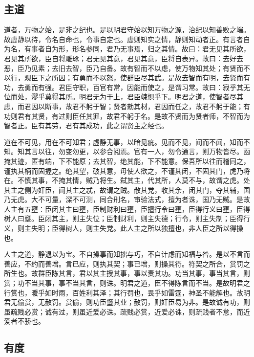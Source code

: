 \documentclass[]{article}
\begin{document}
\hypertarget{header-n836}{%
\subsection{主道}\label{header-n836}}

道者，万物之始，是非之纪也。是以明君守始以知万物之源，治纪以知善败之端。故虚静以待，令名自命也，令事自定也。虚则知实之情，静则知动者正。有言者自为名，有事者自为形，形名参同，君乃无事焉，归之其情。故曰：君无见其所欲，君见其所欲，臣自将雕琢；君无见其意，君见其意，臣将自表异。故曰：去好去恶，臣乃见素；去旧去智，臣乃自备。故有智而不以虑，使万物知其处；有贤而不以行，观臣下之所因；有勇而不以怒，使群臣尽其武。是故去智而有明，去贤而有功，去勇而有强。君臣守职，百官有常，因能而使之，是谓习常。故曰：寂乎其无位而处，漻乎莫得其所。明君无为于上，君臣竦惧乎下。明君之道，使智者尽其虑，而君因以断事，故君不躬于智；贤者勑其材，君因而任之，故君不躬于能；有功则君有其贤，有过则臣任其罪，故君不躬于名。是故不贤而为贤者师，不智而为智者正。臣有其劳，君有其成功，此之谓贤主之经也。

道在不可见，用在不可知君；虚静无事，以暗见疵。见而不见，闻而不闻，知而不知。知其言以往，勿变勿更，以参合阅焉。官有一人，勿令通言，则万物皆尽。函掩其迹，匿有端，下不能原；去其智，绝其能，下不能意。保吾所以往而稽同之，谨执其柄而固握之。绝其望，破其意，毋使人欲之，不谨其闭，不固其门，虎乃将在。不慎其事，不掩其情，贼乃将生。弑其主，代其所，人莫不与，故谓之虎。处其主之侧为奸臣，闻其主之忒，故谓之贼。散其党，收其余，闭其门，夺其辅，国乃无虎。大不可量，深不可测，同合刑名，审验法式，擅为者诛，国乃无贼。是故人主有五壅：臣闭其主曰壅，臣制财利曰壅，臣擅行令曰壅，臣得行义曰壅，臣得树人曰壅。臣闭其主，则主失位；臣制财利，则主失德；行令，则主失制；臣得行义，则主失明；臣得树人，则主失党。此人主之所以独擅也，非人臣之所以得操也。

人主之道，静退以为宝。不自操事而知拙与巧，不自计虑而知福与咎。是以不言而善应，不约而善增。言已应，则执其契；事已增，则操其符。符契之所合，赏罚之所生也。故群臣陈其言，君以其主授其事，事以责其功。功当其事，事当其言，则赏；功不当其事，事不当其言，则诛。明君之道，臣不得陈言而不当。是故明君之行赏也，暖乎如时雨，百姓利其泽；其行罚也，畏乎如雷霆，神圣不能解也。故明君无偷赏，无赦罚。赏偷，则功臣墯其业；赦罚，则奸臣易为非。是故诚有功，则虽疏贱必赏；诚有过，则虽近爱必诛。疏贱必赏，近爱必诛，则疏贱者不怠，而近爱者不骄也。

\hypertarget{header-n840}{%
\subsection{有度}\label{header-n840}}
\end{document}
